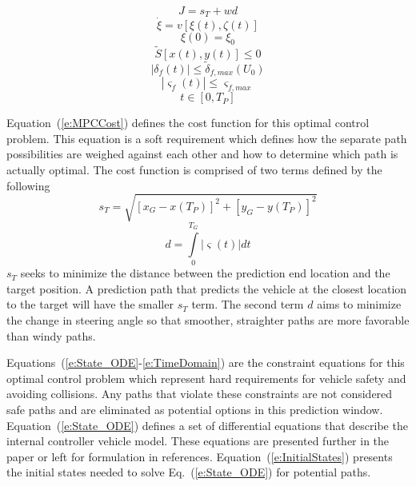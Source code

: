\documentclass[12pt,twocolumn]{article}
\begin{document}
\begin{equation}\label{e:MPCCost}
J = s_T + wd 
\end{equation}
\begin{equation}\label{e:State_ODE}
\dot{\xi} = v\left[\xi\left(t\right),\zeta\left(t\right)\right] 
\end{equation}
\begin{equation}\label{e:InitialStates}
\xi\left(0\right) = \xi_0 
\end{equation}
\begin{equation}\label{e:SafeArea}
\tilde{S}\left[x\left(t\right),y\left(t\right)\right] \leq0  
\end{equation}
\begin{equation}\label{e:SteerLimit}
\left|\delta_f\left(t\right)\right| \leq\tilde{\delta}_{f,max}\left(U_0\right) 
\end{equation}
\begin{equation}\label{e:SteerRateLimit}
\left|\varsigma_f\left(t\right)\right| \leq\varsigma_{f,max} 
\end{equation}
\begin{equation}\label{e:TimeDomain}
t \in \left[0,T_P\right]
\end{equation}

Equation~(\ref{e:MPCCost}) defines the cost function for this optimal control problem. This equation is a soft requirement which defines how the separate path possibilities are weighed against each other and how to determine which path is actually optimal. The cost function is comprised of two terms defined by the following
%
\begin{equation}\label{e:DistanceCost}
s_T = \sqrt{\left[ x_G - x\left(T_P\right)\right]^2 + \left[y_G - y\left(T_P\right)\right]^2 }
\end{equation}
\begin{equation}\label{e:TurningCost}
d = \int \limits_0^{T_G} \left|\varsigma\left(t\right)\right| dt 
\end{equation}
%
$s_{T}$ seeks to minimize the distance between the prediction end location and the target position. A prediction path that predicts the vehicle at the closest location to the target will have the smaller $s_{T}$ term. The second term $d$ aims to minimize the change in steering angle so that smoother, straighter paths are more favorable than windy paths.

Equations~(\ref{e:State_ODE}-\ref{e:TimeDomain}) are the constraint equations for this optimal control problem which represent hard requirements for vehicle safety and avoiding collisions. Any paths that violate these constraints are not considered safe paths and are eliminated as potential options in this prediction window. Equation~(\ref{e:State_ODE}) defines a set of differential equations that describe the internal controller vehicle model. These equations are presented further in the paper or left for formulation in references. Equation~(\ref{e:InitialStates}) presents the initial states needed to solve Eq.~(\ref{e:State_ODE}) for potential paths. 
\end{document}
